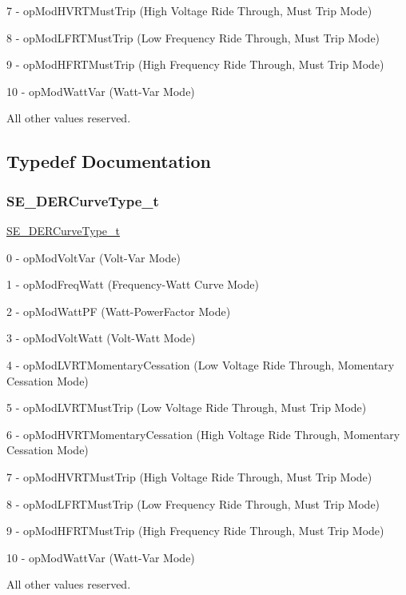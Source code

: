 7 -\/ op\+Mod\+H\+V\+R\+T\+Must\+Trip (High Voltage Ride Through, Must Trip Mode)

8 -\/ op\+Mod\+L\+F\+R\+T\+Must\+Trip (Low Frequency Ride Through, Must Trip Mode)

9 -\/ op\+Mod\+H\+F\+R\+T\+Must\+Trip (High Frequency Ride Through, Must Trip Mode)

10 -\/ op\+Mod\+Watt\+Var (Watt-\/\+Var Mode)

All other values reserved. 

\subsection{Typedef Documentation}
\mbox{\label{group__DERCurveType_gad16d5a3d1a31b3f09dc59e04101c0d8e}} 
\subsubsection{\texorpdfstring{S\+E\+\_\+\+D\+E\+R\+Curve\+Type\+\_\+t}{SE\_DERCurveType\_t}}
{\footnotesize\ttfamily \hyperlink{group__DERCurveType_gad16d5a3d1a31b3f09dc59e04101c0d8e}{S\+E\+\_\+\+D\+E\+R\+Curve\+Type\+\_\+t}}

0 -\/ op\+Mod\+Volt\+Var (Volt-\/\+Var Mode)

1 -\/ op\+Mod\+Freq\+Watt (Frequency-\/\+Watt Curve Mode)

2 -\/ op\+Mod\+Watt\+PF (Watt-\/\+Power\+Factor Mode)

3 -\/ op\+Mod\+Volt\+Watt (Volt-\/\+Watt Mode)

4 -\/ op\+Mod\+L\+V\+R\+T\+Momentary\+Cessation (Low Voltage Ride Through, Momentary Cessation Mode)

5 -\/ op\+Mod\+L\+V\+R\+T\+Must\+Trip (Low Voltage Ride Through, Must Trip Mode)

6 -\/ op\+Mod\+H\+V\+R\+T\+Momentary\+Cessation (High Voltage Ride Through, Momentary Cessation Mode)

7 -\/ op\+Mod\+H\+V\+R\+T\+Must\+Trip (High Voltage Ride Through, Must Trip Mode)

8 -\/ op\+Mod\+L\+F\+R\+T\+Must\+Trip (Low Frequency Ride Through, Must Trip Mode)

9 -\/ op\+Mod\+H\+F\+R\+T\+Must\+Trip (High Frequency Ride Through, Must Trip Mode)

10 -\/ op\+Mod\+Watt\+Var (Watt-\/\+Var Mode)

All other values reserved. 
